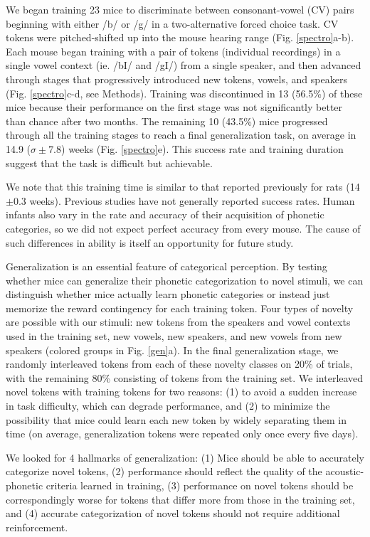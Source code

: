 \documentclass[preprint, NumberedRefs]{JASAnew}\usepackage[]{graphicx}\usepackage[]{color}
\begin{document}
We began training 23 mice to discriminate between consonant-vowel (CV) pairs beginning with either /b/ or /g/ in a two-alternative forced choice task. CV tokens were pitched-shifted up into the mouse hearing range (Fig. \ref{spectro}a-b). Each mouse began training with a pair of tokens (individual recordings) in a single vowel context (ie. /bI/ and /gI/) from a single speaker, and then advanced through stages that progressively introduced new tokens, vowels, and speakers (Fig. \ref{spectro}c-d, see Methods). Training was discontinued in 13 (56.5\%) of these mice because their performance on the first stage was not significantly better than chance after two months. The remaining 10 (43.5\%) mice progressed through all the training stages to reach a final generalization task, on average in 14.9 ($\sigma\pm 7.8$) weeks (Fig. \ref{spectro}e). This success rate and training duration suggest that the task is difficult but achievable. 

We note that this training time is similar to that reported previously for rats (14$\pm 0.3$ weeks\cite{Engineer2015}). Previous studies have not generally reported success rates. Human infants also vary in the rate and accuracy of their acquisition of phonetic categories\cite{Werker1988}, so we did not expect perfect accuracy from every mouse. The cause of such differences in ability is itself an opportunity for future study.

Generalization is an essential feature of categorical perception. By testing whether mice can generalize their phonetic categorization to novel stimuli, we can distinguish whether mice actually learn phonetic categories or instead just memorize the reward contingency for each training token. Four types of novelty are possible with our stimuli: new tokens from the speakers and vowel contexts used in the training set, new vowels, new speakers, and new vowels from new speakers (colored groups in Fig. \ref{gen}a). In the final generalization stage, we randomly interleaved tokens from each of these novelty classes on 20\% of trials, with the remaining 80\% consisting of tokens from the training set. We interleaved novel tokens with training tokens for two reasons: (1) to avoid a sudden increase in task difficulty, which can degrade performance, and (2) to minimize the possibility that mice could learn each new token by widely separating them in time (on average, generalization tokens were repeated only once every five days).

We looked for 4 hallmarks of generalization: (1) Mice should be able to accurately categorize novel tokens, (2) performance should reflect the quality of the acoustic-phonetic criteria learned in training, (3) performance on novel tokens should be correspondingly worse for tokens that differ more from those in the training set, and (4) accurate categorization of novel tokens should not require additional reinforcement.
\end{document}

